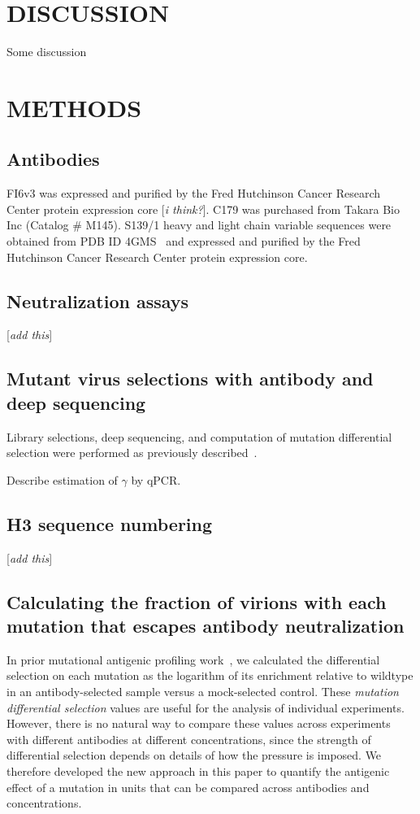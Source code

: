 \documentclass[11pt]{article}
\newcommand{\comment}[1]{{\color{red}[\textsl{#1}]}}
\begin{document}
\section*{DISCUSSION}
Some discussion

\clearpage
\small

\section*{METHODS}
\label{sec:methods}
\subsection*{Antibodies}
FI6v3 was expressed and purified by the Fred Hutchinson Cancer Research Center protein expression core \comment{i think?}.
C179 was purchased from Takara Bio Inc (Catalog \# M145).
S139/1 heavy and light chain variable sequences were obtained from PDB ID 4GMS~\cite{lee2012heterosubtypic} and expressed and purified by the Fred Hutchinson Cancer Research Center protein expression core.

\subsection*{Neutralization assays}
\comment{add this}

\subsection*{Mutant virus selections with antibody and deep sequencing}
Library selections, deep sequencing, and computation of mutation differential selection were performed as previously described~\cite{doud2017complete}. 

Describe estimation of $\gamma$ by qPCR.

\subsection*{H3 sequence numbering}
\comment{add this}

\subsection*{Calculating the fraction of virions with each mutation that escapes antibody neutralization}
In prior mutational antigenic profiling work~\citep{doud2017complete,dingens2017comprehensive}, we calculated the differential selection on each mutation as the logarithm of its enrichment relative to wildtype in an antibody-selected sample versus a mock-selected control.
These \emph{mutation differential selection} values are useful for the analysis of individual experiments.
However, there is no natural way to compare these values across experiments with different antibodies at different concentrations, since the strength of differential selection depends on details of how the pressure is imposed.
We therefore developed the new approach in this paper to quantify the antigenic effect of a mutation in units that can be compared across antibodies and concentrations.
\end{document}
